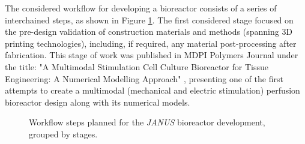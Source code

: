 The considered workflow for developing a bioreactor consists of a series of interchained steps, as shown in Figure \ref{figWorkflow}. The first considered stage focused on the pre-design validation of construction materials and methods (spanning \acs{3D} printing technologies), including, if required, any material post-processing after fabrication. This stage of work was published in MDPI Polymers Journal under the title: "A Multimodal Stimulation Cell Culture Bioreactor for Tissue Engineering: A Numerical Modelling Approach" \cite{Meneses2020-dx}, presenting one of the first attempts to create a multimodal (mechanical and electric stimulation) perfusion bioreactor design along with its numerical models.

\begin{figure}
\caption{Workflow steps planned for the \textit{JANUS} bioreactor development, grouped by stages.}
\label{figWorkflow}
\end{figure}   


